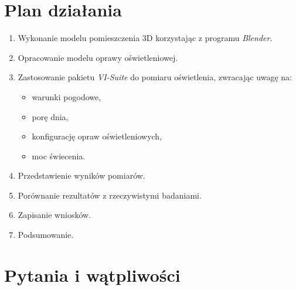 \documentclass[a4paper,12pt]{article}
\begin{document}
	\section{Plan działania}
	\label{sec:plan_dzialania}
		\begin{enumerate}
			\item Wykonanie modelu pomieszczenia 3D korzystając z programu \emph{Blender}.
			\item Opracowanie modelu oprawy oświetleniowej.
			\item Zastosowanie pakietu \emph{VI-Suite} do pomiaru oświetlenia, zwracając uwagę na:
			\begin{itemize}
				\item warunki pogodowe,
				\item porę dnia,
				\item konfigurację opraw oświetleniowych,
				\item moc świecenia.
   			\end{itemize}
			\item Przedstawienie wyników pomiarów.
			\item Porównanie rezultatów z rzeczywistymi badaniami.
			\item Zapisanie wniosków.
			\item Podsumowanie.
		\end{enumerate}
	
	\section{Pytania i wątpliwości}
	\label{sec:pytania_watpliwosci}

	
\end{document}
